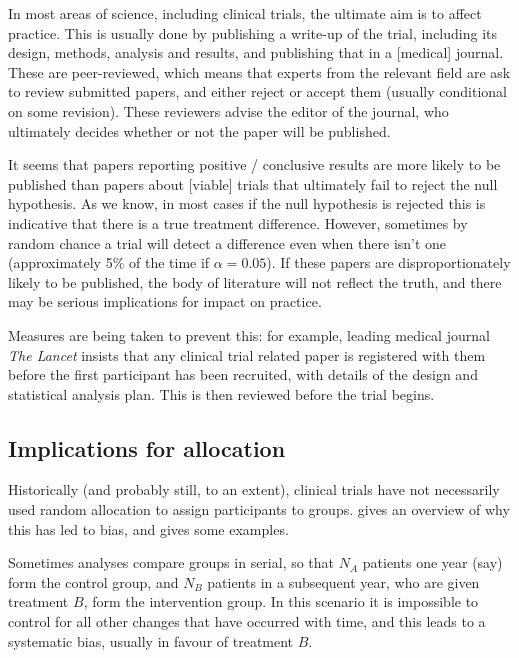 \documentclass[
  openany]{book}
\theoremstyle{definition}
\theoremstyle{definition}
\theoremstyle{definition}
\theoremstyle{definition}
\theoremstyle{remark}
\begin{document}
In most areas of science, including clinical trials, the ultimate aim is to affect practice. This is usually done by publishing a write-up of the trial, including its design, methods, analysis and results, and publishing that in a {[}medical{]} journal. These are peer-reviewed, which means that experts from the relevant field are ask to review submitted papers, and either reject or accept them (usually conditional on some revision). These reviewers advise the editor of the journal, who ultimately decides whether or not the paper will be published.

It seems that papers reporting positive / conclusive results are more likely to be published than papers about {[}viable{]} trials that ultimately fail to reject the null hypothesis. As we know, in most cases if the null hypothesis is rejected this is indicative that there is a true treatment difference. However, sometimes by random chance a trial will detect a difference even when there isn't one (approximately 5\% of the time if \(\alpha=0.05\)). If these papers are disproportionately likely to be published, the body of literature will not reflect the truth, and there may be serious implications for impact on practice.

Measures are being taken to prevent this: for example, leading medical journal \emph{The Lancet} insists that any clinical trial related paper is registered with them before the first participant has been recruited, with details of the design and statistical analysis plan. This is then reviewed before the trial begins.

\hypertarget{implications-for-allocation}{%
\subsection{Implications for allocation}\label{implications-for-allocation}}

Historically (and probably still, to an extent), clinical trials have not necessarily used random allocation to assign participants to groups. \citet{altman1999treatment} gives an overview of why this has led to bias, and gives some examples.

Sometimes analyses compare groups in serial, so that \(N_A\) patients one year (say) form the control group, and \(N_B\) patients in a subsequent year, who are given treatment \(B\), form the intervention group. In this scenario it is impossible to control for all other changes that have occurred with time, and this leads to a systematic bias, usually in favour of treatment \(B\).
\end{document}
